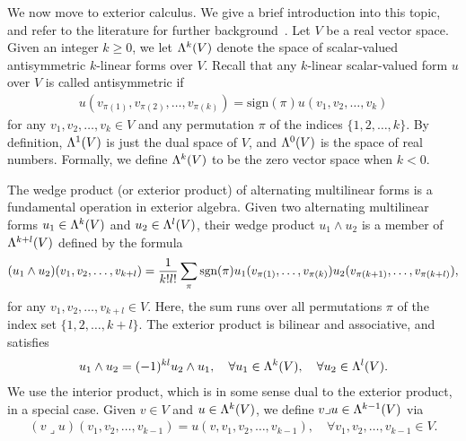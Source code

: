 \documentclass[10pt,letterpaper]{article}
\newcommand\cye[1]{%
  \protect\leavevmode
  \begingroup
    \color{red!35!yellow}%
    #1%
  \endgroup
}
\begin{document}
\cye{We now move to} exterior calculus. 
We give a brief introduction into this topic, and refer to the literature for further background~\cite{lee2012smooth}. 
Let $V$ be a real vector space. 
Given an integer $k \geq 0$, we let $\Lambda^{k}(V)$ denote the space of scalar-valued antisymmetric $k$-linear forms over $V$. 
Recall that any $k$-linear scalar-valued form $u$ over $V$ is called antisymmetric
if 
\begin{gather*} 
    u( v_{\pi(1)}, v_{\pi(2)}, \ldots, v_{\pi(k)} ) 
    = 
    \text{sign}(\pi) 
    u( v_1, v_2, \ldots, v_k ) 
\end{gather*}
for any $v_1, v_2, \dots, v_k \in V$ and any permutation $\pi$ of the indices \(\{1, 2, \ldots, k\}\). 
By definition, $\Lambda^{1}(V)$ is just the dual space of $V$, and $\Lambda^{0}(V)$ is the space of real numbers. 
Formally, we define $\Lambda^{k}(V)$ to be the zero vector space when $k < 0$. 

The wedge product (or exterior product) of alternating multilinear forms is a fundamental operation in exterior algebra. 
Given two alternating multilinear forms \( u_1 \in \Lambda^{k}(V) \) and \( u_2 \in \Lambda^{l}(V) \), 
their wedge product \( u_1 \wedge u_2 \) is a member of $\Lambda^{k+l}(V)$
defined by the formula 
\begin{gather*}
    (u_1 \wedge u_2)(v_1, v_2, \ldots, v_{k+l}) 
    = 
    \frac{1}{k! l!} 
    \sum_{ \pi } 
    \operatorname{sgn}(\pi) 
    u_1( v_{\pi(  1)}, \ldots, v_{\pi(k  )} ) 
    u_2( v_{\pi(k+1)}, \ldots, v_{\pi(k+l)} ),
\end{gather*}
for any \( v_1, v_2, \ldots, v_{k+l} \in V \).
Here, the sum runs over all permutations $\pi$ of the index set \(\{ 1, 2, \ldots, k+l \}\).
The exterior product is bilinear and associative, and satisfies 
\begin{align*}
    u_1 \wedge u_2 = (-1)^{kl} u_2 \wedge u_1,
    \quad 
    \forall u_1 \in \Lambda^{k}(V),
    \quad 
    \forall u_2 \in \Lambda^{l}(V).
\end{align*}
We use the interior product, which is in some sense dual to the exterior product, in a special case. Given $v \in V$ and $u \in \Lambda^{k}(V)$, we define $v \lrcorner u \in \Lambda^{k-1}(V)$ via 
\begin{align*}
    (v \lrcorner u)( v_1, v_2, \ldots, v_{k-1} ) = u( v, v_1, v_2, \ldots, v_{k-1} ),
    \quad 
    \forall v_1, v_2, \ldots, v_{k-1} \in V.
\end{align*}
\end{document}
